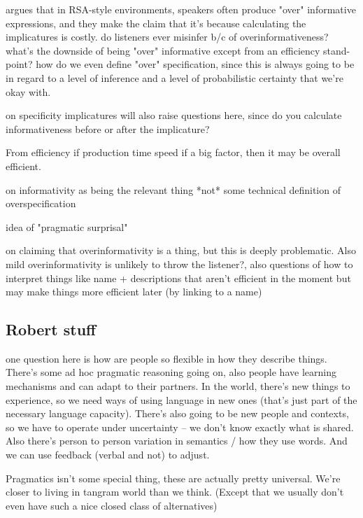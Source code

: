 \documentclass[]{article}
\begin{document}
\cite{baumann2014} argues that in RSA-style environments, speakers often produce "over" informative expressions, and they make the claim that it's because calculating the implicatures is costly.  do listeners ever misinfer b/c of overinformativeness? what's the downside of being "over" informative except from an efficiency stand-point? how do we even define "over" specification, since this is always going to be in regard to a level of inference and a level of probabilistic certainty that we're okay with. 

\cite{bergen} on specificity implicatures will also raise questions here, since do you calculate informativeness before or after the implicature? 

From efficiency if production time speed if a big factor, then it may be overall efficient. 

\cite{degen20200406} on informativity as being the relevant thing *not* some technical definition of overspecification 

idea of "pragmatic surprisal" 

\cite{heller2012} on claiming that overinformativity is a thing, but this is deeply problematic. Also mild overinformativity is unlikely to throw the listener?, also questions of how to interpret things like name + descriptions that aren't efficient in the moment but may make things more efficient later (by linking to a name) 

\subsection{Robert stuff} 

\cite{hawkins2020b} one question here is how are people so flexible in how they describe things. There's some ad hoc pragmatic reasoning going on, also people have learning mechanisms and can adapt to their partners. In the world, there's new things to experience, so we need ways of using language in new ones (that's just part of the necessary language capacity). There's also going to be new people and contexts, so we have to operate under uncertainty -- we don't know exactly what is shared. Also there's person to person variation in semantics / how they use words. And we can use feedback (verbal and not) to adjust. 

Pragmatics isn't some special thing, these are actually pretty universal. We're closer to living in tangram world than we think. (Except that we usually don't even have such a nice closed class of alternatives) 
\end{document}

